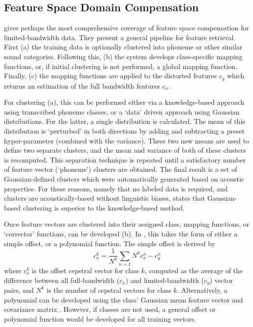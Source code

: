 \subsection{Feature Space Domain Compensation}\label{sec:feat-space-comp}

\cite{morales:09} gives perhaps the most comprehensive coverage of feature space compensation for limited-bandwidth data.  They present a general pipeline for feature retrieval.  First (a) the training data is optionally clustered into phoneme or other similar sound categories.  Following this, (b) the system develops class-specific mapping functions, or, if initial clustering is not performed, a global mapping function.  Finally, (c) the mapping functions are applied to the distorted features $c_y$ which returns an estimation of the full bandwidth features $c_x$.

For clustering (a), this can be performed either via a knowledge-based approach using transcribed phoneme classes, or a `data' driven approach using Gaussian distributions.  For the latter, a single distribution is calculated.  The mean of this distribution is `perturbed' in both directions by adding and subtracting a preset hyper-parameter (combined with the variance).  These two new means are used to define two separate clusters, and the mean and variance of both of these clusters is recomputed.  This separation technique is repeated until a satisfactory number of feature vector (`phoneme') clusters are obtained.  The final result is a set of Gaussian-defined clusters which were automatically generated based on acoustic properties.  For these reasons, namely that no labeled data is required, and clusters are acoustically-based without linguistic biases, \cite{morales:05b} states that Gaussian-based clustering is superior to the knowledge-based method.

Once feature vectors are clustered into their assigned class, mapping functions, or `corrector' functions, can be developed (b).  In \cite{morales:05b}, this takes the form of either a simple offset, or a polynomial function.  The simple offset is derived by \begin{equation} c_o^k = \dfrac{1}{N^k} \sum_{n=1}{N^k} c_x^n - c_y^n \end{equation} where $c_o^k$ is the offset cepstral vector for class $k$, computed as the average of the difference between all full-bandwidth ($c_x$) and limited-bandwidth ($c_y$) vector pairs, and $N^k$ is the number of cepstral vectors for class $k$.  Alternatively, a polynomial can be developed using the class' Gaussian mean feature vector and covariance matrix \cite{morales:05b,morales:09}.  However, if classes are not used, a general offset or polynomial function would be developed for all training vectors.

